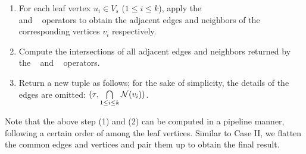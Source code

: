 \begin{enumerate}
\item For each leaf vertex $u_i \in V_s$ ($1 \leq i \leq k$), apply the \expandedge~ \\ and \getvertex~ operators to obtain the adjacent edges and neighbors of the corresponding vertices $v_i$ respectively.
\item Compute the intersections of all adjacent edges and neighbors returned by the \expandedge~ and \getvertex~ operators.
\item Return a new tuple as follows; for the sake of simplicity, the details of the edges are omitted: $(\tau, \bigcap\limits_{1 \leq i \leq k}{\mathcal{N}}(v_i))$.


\end{enumerate}

Note that the above step (1) and (2) can be computed in a pipeline manner, following a certain order of among the leaf vertices.
Similar to Case II, we flatten the common edges and vertices and pair them up to obtain the final result.


